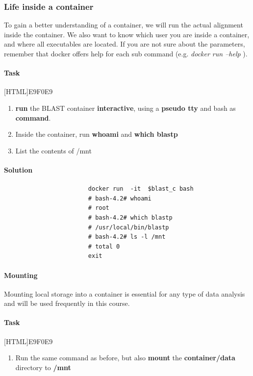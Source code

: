 \documentclass[12pt]{article}
\begin{document}
			\subsubsection{Life inside a container}
				To gain a better understanding of a container, we will run the actual alignment inside the container. 
				We also want to know which user you are inside a container, and where all executables are located.
				If you are not sure about the parameters, remember that docker offers help for each sub command (e.g.  \textit{docker run --help} ).
			
			\paragraph{Task}
				[HTML]{E9F0E9}{\parbox{\linewidth}{%
						\begin{enumerate}
							\item \textbf{run} the BLAST container \textbf{interactive}, using a \textbf{pseudo tty} and bash as \textbf{command}. 
							\item Inside the container, run \textbf{whoami} and \textbf{which blastp} 
							\item List the contents of /mnt
						\end{enumerate}
				}}

			\paragraph{Solution}	
	
				\begin{minipage}{\linewidth}			
					\begin{lstlisting}
						docker run  -it  $blast_c bash
						# bash-4.2# whoami
						# root
						# bash-4.2# which blastp
						# /usr/local/bin/blastp
						# bash-4.2# ls -l /mnt
						# total 0
						exit
					\end{lstlisting}
				\end{minipage}	
			
				\paragraph{Mounting}
					Mounting local storage into a container is essential for any type of data analysis and will be used frequently in this course.
			
				\paragraph{Task}
					[HTML]{E9F0E9}{\parbox{\linewidth}{%
							\begin{enumerate}
								\item 	Run the same command as before, but also \textbf{mount} the \textbf{container/data} directory to \textbf{/mnt} 
							\end{enumerate}
					}}
	
\end{document}
